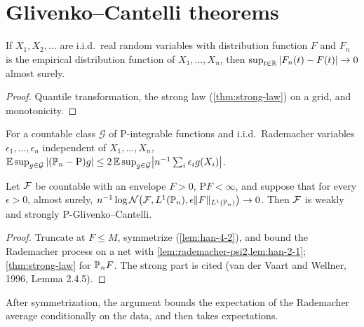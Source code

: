 \section{Glivenko--Cantelli theorems}

\begin{theorem}
  \label{thm:han-4-1}
  If $X_1,X_2,\dots$ are i.i.d.\ real random variables with distribution function $F$ and $F_n$ is the empirical distribution function of $X_1,\dots,X_n$, then $\sup_{t\in\mathbb{R}}|F_n(t)-F(t)|\to0$ almost surely.
\end{theorem}
\begin{proof}
  Quantile transformation, the strong law (\cref{thm:strong-law}) on a grid, and monotonicity.
\end{proof}

\begin{lemma}
  \label{lem:han-4-2}
  For a countable class $\mathcal G$ of $\mathrm P$-integrable functions and i.i.d.\ Rademacher variables $\epsilon_1,\dots,\epsilon_n$ independent of $X_1,\dots,X_n$,
  $\mathbb{E}\sup_{g\in\mathcal G}|(\mathbb{P}_n-\mathrm P)g|\le2\,\mathbb{E}\sup_{g\in\mathcal G}\bigl|n^{-1}\sum_i\epsilon_ig(X_i)\bigr|$.
\end{lemma}

\begin{theorem}
  \label{thm:han-4-7}
  Let $\mathcal{F}$ be countable with an envelope $F>0$, $\mathrm PF<\infty$, and suppose that for every $\epsilon>0$, almost surely, $n^{-1}\log\mathcal{N}\bigl(\mathcal{F},L^1(\mathbb{P}_n),\epsilon\|F\|_{L^1(\mathbb{P}_n)}\bigr)\to0$. Then $\mathcal{F}$ is weakly and strongly $\mathrm P$-Glivenko--Cantelli.
\end{theorem}
\begin{proof}
  Truncate at $F\le M$, symmetrize (\cref{lem:han-4-2}), and bound the Rademacher process on a net with \cref{lem:rademacher-psi2,lem:han-2-1}; \cref{thm:strong-law} for $\mathbb{P}_n F$. The strong part is cited (van der Vaart and Wellner, 1996, Lemma 2.4.5).
\end{proof}
\begin{remark}
  After symmetrization, the argument bounds the expectation of the Rademacher average conditionally on the data, and then takes expectations.
\end{remark}

